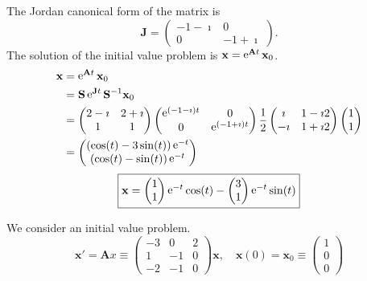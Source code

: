 {\begin{Solution}
  The Jordan canonical form of the matrix is
  \[
  \mathbf{J} =
  \begin{pmatrix}
    -1 - \imath & 0 \\
    0 & -1 + \imath
  \end{pmatrix}.
  \]
  The solution of the initial value problem is $\mathbf{x} = \mathop{\mathrm{e}}\nolimits^{\mathbf{A} t} \mathbf{x}_0$.
  \begin{align*}
    \mathbf{x} &= \mathop{\mathrm{e}}\nolimits^{\mathbf{A} t} \mathbf{x}_0 \\
    &= \mathbf{S} \mathop{\mathrm{e}}\nolimits^{\mathbf{J} t} \mathbf{S}^{-1} \mathbf{x}_0 \\
    &= \begin{pmatrix} 2 - \imath & 2 + \imath \\ 1 & 1 \end{pmatrix}
    \begin{pmatrix} \mathop{\mathrm{e}}\nolimits^{(-1 - \imath)t} & 0 \\ 0 & \mathop{\mathrm{e}}\nolimits^{(-1 + \imath) t} \end{pmatrix}
    \frac{1}{2} \begin{pmatrix} \imath & 1 - \imath 2 \\ 
      -\imath & 1 + \imath 2 \end{pmatrix}
    \begin{pmatrix} 1 \\ 1 \end{pmatrix} \\
    &= \begin{pmatrix} (\cos(t) - 3 \sin(t))\mathop{\mathrm{e}}\nolimits^{-t} \\
      (\cos(t) - \sin(t)) \mathop{\mathrm{e}}\nolimits^{-t} \end{pmatrix}
  \end{align*}
  \[
  \boxed{
    \mathbf{x} = 
    \begin{pmatrix} 1 \\ 1 \end{pmatrix} \mathop{\mathrm{e}}\nolimits^{-t} \cos(t) 
    - \begin{pmatrix} 3 \\ 1 \end{pmatrix} \mathop{\mathrm{e}}\nolimits^{-t} \sin(t) 
    }
  \]
\end{Solution}











\begin{Solution}
  \label{solution x'=(-3021-10-2-10)x}
  We consider an initial value problem.
  \[
  \mathbf{x}' = \mathbf{A} x \equiv
  \begin{pmatrix}
    -3 & 0 & 2 \\
    1 & -1 & 0 \\
    -2 & -1 & 0
  \end{pmatrix} 
  \mathbf{x}, \quad 
  \mathbf{x}(0) = \mathbf{x}_0 \equiv
  \begin{pmatrix}
    1 \\
    0 \\
    0
  \end{pmatrix}
  \]


\end{Solution}}
